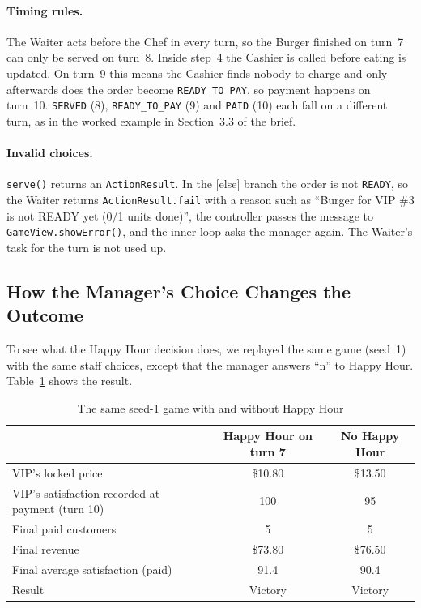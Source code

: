 \paragraph{Timing rules.} The Waiter acts before the Chef in every turn, so the Burger finished on turn~7 can only be served on turn~8. Inside step~4 the Cashier is called before eating is updated. On turn~9 this means the Cashier finds nobody to charge and only afterwards does the order become \texttt{READY\_TO\_PAY}, so payment happens on turn~10. \texttt{SERVED} (8), \texttt{READY\_TO\_PAY} (9) and \texttt{PAID} (10) each fall on a different turn, as in the worked example in Section~3.3 of the brief.

\paragraph{Invalid choices.} \texttt{serve()} returns an \texttt{ActionResult}. In the \textsf{[else]} branch the order is not \texttt{READY}, so the Waiter returns \texttt{ActionResult.fail} with a reason such as ``Burger for VIP \#3 is not READY yet (0/1 units done)'', the controller passes the message to \texttt{GameView.showError()}, and the inner \textsf{loop} asks the manager again. The Waiter's task for the turn is not used up.

\subsection{How the Manager's Choice Changes the Outcome}

To see what the Happy Hour decision does, we replayed the same game (seed~1) with the same staff choices, except that the manager answers ``n'' to Happy Hour. Table~\ref{tab:seq-compare} shows the result.

\begin{table}[H]
\centering
\small
\begin{tabular}{@{}lcc@{}}
\toprule
 & \textbf{Happy Hour on turn 7} & \textbf{No Happy Hour} \\
\midrule
VIP's locked price & \$10.80 & \$13.50 \\
VIP's satisfaction recorded at payment (turn 10) & 100 & 95 \\
Final paid customers & 5 & 5 \\
Final revenue & \$73.80 & \$76.50 \\
Final average satisfaction (paid) & 91.4 & 90.4 \\
Result & Victory & Victory \\
\bottomrule
\end{tabular}
\caption{The same seed-1 game with and without Happy Hour}
\label{tab:seq-compare}
\end{table}

